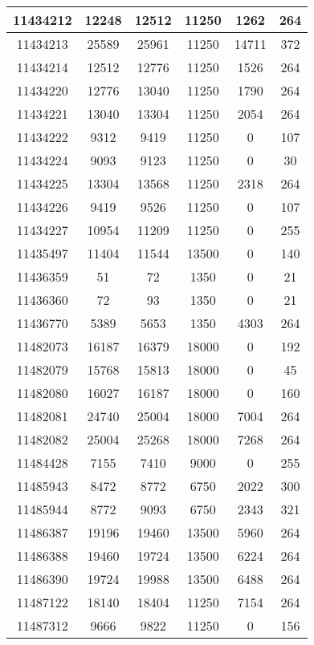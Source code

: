 \begin{appendices}
\begin{center}
\begin{longtable}{|c|c|c|c|c|c|}
11434212 & 12248 & 12512 & 11250 & 1262  & 264 \\ \hline
11434213 & 25589 & 25961 & 11250 & 14711 & 372 \\ \hline
11434214 & 12512 & 12776 & 11250 & 1526  & 264 \\ \hline
11434220 & 12776 & 13040 & 11250 & 1790  & 264 \\ \hline
11434221 & 13040 & 13304 & 11250 & 2054  & 264 \\ \hline
11434222 & 9312  & 9419  & 11250 & 0     & 107 \\ \hline
11434224 & 9093  & 9123  & 11250 & 0     & 30  \\ \hline
11434225 & 13304 & 13568 & 11250 & 2318  & 264 \\ \hline
11434226 & 9419  & 9526  & 11250 & 0     & 107 \\ \hline
11434227 & 10954 & 11209 & 11250 & 0     & 255 \\ \hline
11435497 & 11404 & 11544 & 13500 & 0     & 140 \\ \hline
11436359 & 51    & 72    & 1350  & 0     & 21  \\ \hline
11436360 & 72    & 93    & 1350  & 0     & 21  \\ \hline
11436770 & 5389  & 5653  & 1350  & 4303  & 264 \\ \hline
11482073 & 16187 & 16379 & 18000 & 0     & 192 \\ \hline
11482079 & 15768 & 15813 & 18000 & 0     & 45  \\ \hline
11482080 & 16027 & 16187 & 18000 & 0     & 160 \\ \hline
11482081 & 24740 & 25004 & 18000 & 7004  & 264 \\ \hline
11482082 & 25004 & 25268 & 18000 & 7268  & 264 \\ \hline
11484428 & 7155  & 7410  & 9000  & 0     & 255 \\ \hline
11485943 & 8472  & 8772  & 6750  & 2022  & 300 \\ \hline
11485944 & 8772  & 9093  & 6750  & 2343  & 321 \\ \hline
11486387 & 19196 & 19460 & 13500 & 5960  & 264 \\ \hline
11486388 & 19460 & 19724 & 13500 & 6224  & 264 \\ \hline
11486390 & 19724 & 19988 & 13500 & 6488  & 264 \\ \hline
11487122 & 18140 & 18404 & 11250 & 7154  & 264 \\ \hline
11487312 & 9666  & 9822  & 11250 & 0     & 156 \\ \hline

\end{longtable}
\end{center}
\end{appendices}
